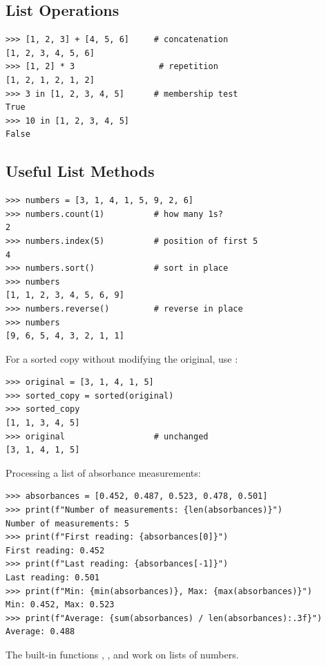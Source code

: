 \subsection{List Operations}

\begin{lstlisting}
>>> [1, 2, 3] + [4, 5, 6]     # concatenation
[1, 2, 3, 4, 5, 6]
>>> [1, 2] * 3                 # repetition
[1, 2, 1, 2, 1, 2]
>>> 3 in [1, 2, 3, 4, 5]      # membership test
True
>>> 10 in [1, 2, 3, 4, 5]
False
\end{lstlisting}

\subsection{Useful List Methods}

\begin{lstlisting}
>>> numbers = [3, 1, 4, 1, 5, 9, 2, 6]
>>> numbers.count(1)          # how many 1s?
2
>>> numbers.index(5)          # position of first 5
4
>>> numbers.sort()            # sort in place
>>> numbers
[1, 1, 2, 3, 4, 5, 6, 9]
>>> numbers.reverse()         # reverse in place
>>> numbers
[9, 6, 5, 4, 3, 2, 1, 1]
\end{lstlisting}

For a sorted copy without modifying the original, use :

\begin{lstlisting}
>>> original = [3, 1, 4, 1, 5]
>>> sorted_copy = sorted(original)
>>> sorted_copy
[1, 1, 3, 4, 5]
>>> original                  # unchanged
[3, 1, 4, 1, 5]
\end{lstlisting}

\begin{labexample}
Processing a list of absorbance measurements:
\begin{lstlisting}
>>> absorbances = [0.452, 0.487, 0.523, 0.478, 0.501]
>>> print(f"Number of measurements: {len(absorbances)}")
Number of measurements: 5
>>> print(f"First reading: {absorbances[0]}")
First reading: 0.452
>>> print(f"Last reading: {absorbances[-1]}")
Last reading: 0.501
>>> print(f"Min: {min(absorbances)}, Max: {max(absorbances)}")
Min: 0.452, Max: 0.523
>>> print(f"Average: {sum(absorbances) / len(absorbances):.3f}")
Average: 0.488
\end{lstlisting}
The built-in functions , , and  work on lists of numbers.
\end{labexample}

